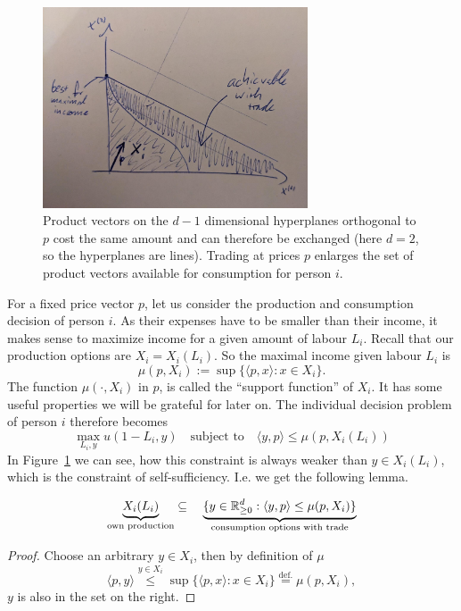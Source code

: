 \begin{figure}
	\centering
	\includegraphics[width=0.7\textwidth]{images/consumption_increase_by_trade.jpeg}
	\caption{
		Product vectors on the \(d-1\) dimensional hyperplanes orthogonal to \(p\)
		cost the same amount and can therefore be exchanged (here \(d=2\), so the
		hyperplanes are lines). Trading at prices \(p\) enlarges the set of
		product vectors available for consumption for person \(i\).
	}
	\label{fig: consumption increase by trade}
\end{figure}
For a fixed price vector \(p\), let us consider the production and consumption
decision of person \(i\). As their expenses have to be smaller than their
income, it makes sense to maximize income for a given amount of labour \(L_i\).
Recall that our production options are \(X_i=X_i(L_i)\). So the maximal income
given labour \(L_i\) is
\[
	\tag{income}\label{eq: income}
	\mu(p, X_i) := \sup\{\langle p, x\rangle : x\in X_i\}.
\]
The function \(\mu(\cdot, X_i)\) in \(p\), is called the ``support function'' of
\(X_i\). It has some useful properties we will be grateful for later on. The
individual decision problem of person \(i\) therefore becomes
\begin{equation}
	\tag{IDP}
	\label{eq: individual decision problem}
	\max_{L_i, y} u(1-L_i, y) \quad\text{subject to}\quad \langle y, p\rangle \le \mu(p, X_i(L_i))
\end{equation}
In Figure~\ref{fig: consumption increase by trade} we can see, how this
constraint is always weaker than \(y\in X_i(L_i)\), which is the constraint of
self-sufficiency. I.e. we get the following lemma.

\begin{lemma}
\[
	\underbrace{X_i(L_i)}_{\text{own production}}
	\subseteq \quad
	\underbrace{
		\{y\in\mathbb{R}_{\ge 0}^d: \langle y, p\rangle \le \mu(p, X_i)\}
	}_{\text{consumption options with trade}}
\]
\end{lemma}
\begin{proof}
	Choose an arbitrary \(y\in X_i\), then by definition of \(\mu\)
	\[
		\langle p, y\rangle \overset{y\in X_i}\le \sup\{\langle p, x\rangle : x\in
		X_i\} \overset{\text{def.}}= \mu(p, X_i),
	\]
	\(y\) is also in the set on the right.
\end{proof}

